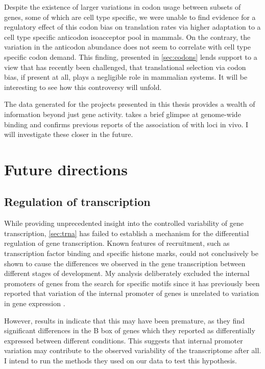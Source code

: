 Despite the existence of larger variations in codon usage between subsets of
genes, some of which are cell type specific, we were unable to find evidence for
a regulatory effect of this codon bias on translation rates via higher
adaptation to a cell type specific \trna anticodon isoacceptor pool in mammals.
On the contrary, the variation in the \trna anticodon abundance does not seem to
correlate with cell type specific codon demand. This finding, presented in
\cref{sec:codons} lends support to a view that has recently been challenged,
that translational selection via codon bias, if present at all, plays a
negligible role in mammalian systems. It will be interesting to see how this
controversy will unfold.

The  \chipseq data generated for the projects presented in this thesis
provides a wealth of information beyond just \trna gene activity.
 takes a brief glimpse at genome-wide  binding and confirms
previous reports of the association of  with \transsine loci in vivo. I
will investigate these closer in the future.

\section{Future directions}

\subsection{Regulation of  transcription}

While providing unprecedented insight into the controlled variability of \trna
gene transcription, \cref{sec:trna} has failed to establish a mechanism for the
differential regulation of \trna gene transcription. Known features of 
recruitment, such as transcription factor binding and specific histone marks,
could not conclusively be shown to cause the differences we observed in the
\trna gene transcription between different stages of development. My analysis
deliberately excluded the internal promoters of \trna genes from the search for
specific motifs since it has previously been reported that variation of the
internal promoter of \trna genes is unrelated to variation in gene expression
\citep{Oler:2010,Canella:2012}.

However, results in \citet{Gingold:2014} indicate that this may have been
premature, as they find significant differences in the B box of \trna genes
which they reported as differentially expressed between different conditions.
This suggests that internal promoter variation may contribute to the observed
variability of the \trna transcriptome after all. I intend to run the methods
they used on our data to test this hypothesis.

